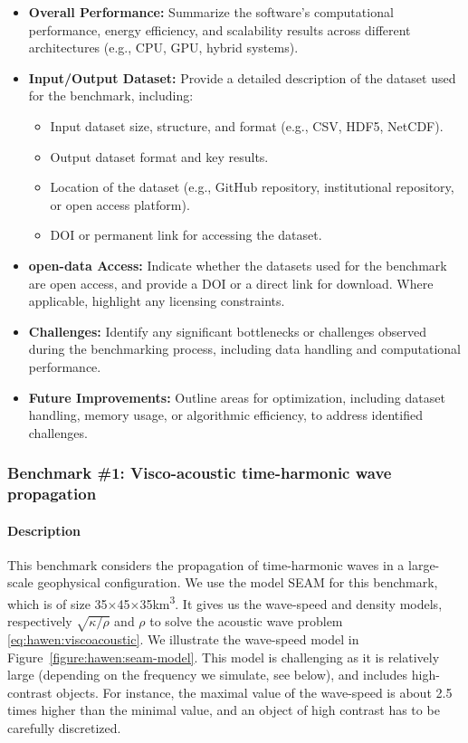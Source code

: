 \begin{itemize}
    \item \textbf{Overall Performance:} Summarize the software's computational performance, energy efficiency, and scalability results across different architectures (e.g., CPU, GPU, hybrid systems).
    \item \textbf{Input/Output Dataset:} Provide a detailed description of the dataset used for the benchmark, including:
        \begin{itemize}
            \item Input dataset size, structure, and format (e.g., CSV, HDF5, NetCDF).
            \item Output dataset format and key results.
            \item Location of the dataset (e.g., GitHub repository, institutional repository, or open access platform).
            \item DOI or permanent link for accessing the dataset.
        \end{itemize}
    \item \textbf{open-data Access:} Indicate whether the datasets used for the benchmark are open access, and provide a DOI or a direct link for download. Where applicable, highlight any licensing constraints.
    \item \textbf{Challenges:} Identify any significant bottlenecks or challenges observed during the benchmarking process, including data handling and computational performance.
    \item \textbf{Future Improvements:} Outline areas for optimization, including dataset handling, memory usage, or algorithmic efficiency, to address identified challenges.
\end{itemize}

\subsubsection{Benchmark \#1: Visco-acoustic time-harmonic wave propagation}

\paragraph{Description}
This benchmark considers the propagation of time-harmonic waves in a large-scale
geophysical configuration. We use the model SEAM for this benchmark, which is of
size \num{35}$\times$\num{45}$\times$\num{35}\si{\km\cubed}.  
It gives us the wave-speed and density models, respectively $\sqrt{\kappa/\rho}$ 
and $\rho$ to solve the acoustic wave problem \eqref{eq:hawen:viscoacoustic}.
We illustrate the wave-speed model in Figure~\ref{figure:hawen:seam-model}.
This model is challenging as it is relatively large (depending on the frequency
we simulate, see below), and includes high-contrast objects. 
For instance, the maximal value of the wave-speed is about 2.5 times higher than
the minimal value, and an object of high contrast has to be carefully discretized.


